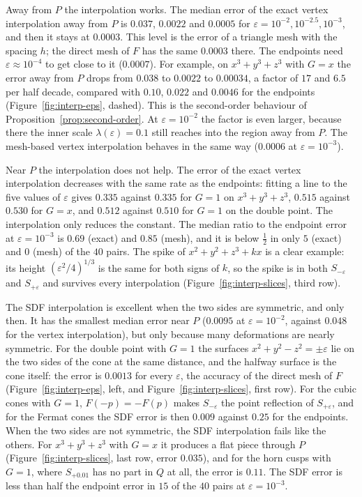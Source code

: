 \documentclass[12pt, a4paper, oneside]{book}
\theoremstyle{plain}
\theoremstyle{definition}
\theoremstyle{remark}
\theoremstyle{definition}
\begin{document}
Away from $P$ the interpolation works. The median error of the exact vertex interpolation away from $P$ is $0.037$, $0.0022$ and $0.0005$ for $\varepsilon=10^{-2},10^{-2.5},10^{-3}$, and then it stays at $0.0003$. This level is the error of a triangle mesh with the spacing $h$; the direct mesh of $F$ has the same $0.0003$ there. The endpoints need $\varepsilon\approx10^{-4}$ to get close to it ($0.0007$). For example, on $x^3+y^3+z^3$ with $G=x$ the error away from $P$ drops from $0.038$ to $0.0022$ to $0.00034$, a factor of $17$ and $6.5$ per half decade, compared with $0.10$, $0.022$ and $0.0046$ for the endpoints (Figure~\ref{fig:interp-eps}, dashed). This is the second-order behaviour of Proposition~\ref{prop:second-order}. At $\varepsilon=10^{-2}$ the factor is even larger, because there the inner scale $\lambda(\varepsilon)=0.1$ still reaches into the region away from $P$. The mesh-based vertex interpolation behaves in the same way ($0.0006$ at $\varepsilon=10^{-3}$).

Near $P$ the interpolation does not help. The error of the exact vertex interpolation decreases with the same rate as the endpoints: fitting a line to the five values of $\varepsilon$ gives $0.335$ against $0.335$ for $G=1$ on $x^3+y^3+z^3$, $0.515$ against $0.530$ for $G=x$, and $0.512$ against $0.510$ for $G=1$ on the double point. The interpolation only reduces the constant. The median ratio to the endpoint error at $\varepsilon=10^{-3}$ is $0.69$ (exact) and $0.85$ (mesh), and it is below $\tfrac12$ in only $5$ (exact) and $0$ (mesh) of the $40$ pairs. The spike of $x^2+y^2+z^3+kx$ is a clear example: its height $(\varepsilon^2/4)^{1/3}$ is the same for both signs of $k$, so the spike is in both $S_{-\varepsilon}$ and $S_{+\varepsilon}$ and survives every interpolation (Figure~\ref{fig:interp-slices}, third row).

The SDF interpolation is excellent when the two sides are symmetric, and only then. It has the smallest median error near $P$ ($0.0095$ at $\varepsilon=10^{-2}$, against $0.048$ for the vertex interpolation), but only because many deformations are nearly symmetric. For the double point with $G=1$ the surfaces $x^2+y^2-z^2=\pm\varepsilon$ lie on the two sides of the cone at the same distance, and the halfway surface is the cone itself: the error is $0.0013$ for every $\varepsilon$, the accuracy of the direct mesh of $F$ (Figure~\ref{fig:interp-eps}, left, and Figure~\ref{fig:interp-slices}, first row). For the cubic cones with $G=1$, $F(-p)=-F(p)$ makes $S_{-\varepsilon}$ the point reflection of $S_{+\varepsilon}$, and for the Fermat cones the SDF error is then $0.009$ against $0.25$ for the endpoints. When the two sides are not symmetric, the SDF interpolation fails like the others. For $x^3+y^3+z^3$ with $G=x$ it produces a flat piece through $P$ (Figure~\ref{fig:interp-slices}, last row, error $0.035$), and for the horn cusps with $G=1$, where $S_{+0.01}$ has no part in $Q$ at all, the error is $0.11$. The SDF error is less than half the endpoint error in $15$ of the $40$ pairs at $\varepsilon=10^{-3}$.
\end{document}
